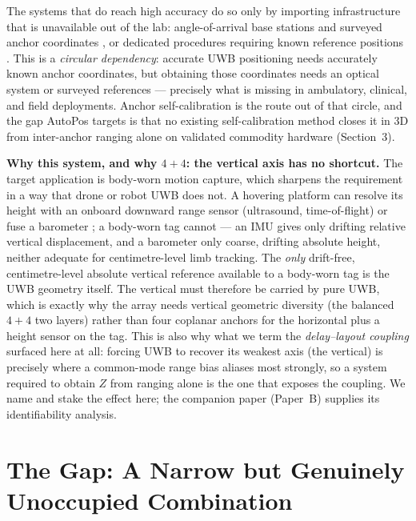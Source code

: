 \documentclass[11pt,a4paper]{article}
\begin{document}
The systems that do reach high accuracy do so only by importing infrastructure that is unavailable
out of the lab: angle-of-arrival base stations and surveyed anchor coordinates
\citep{zihajehzadeh_2017}, or dedicated
procedures requiring known reference positions \citep{kok_2015}. This is a \emph{circular
dependency}: accurate UWB positioning needs accurately known anchor coordinates, but obtaining those
coordinates needs an optical system or surveyed references --- precisely what is missing in
ambulatory, clinical, and field deployments. Anchor self-calibration is the route out of that
circle, and the gap AutoPos targets is that no existing self-calibration method closes it in 3D from
inter-anchor ranging alone on validated commodity hardware (Section~3).

\textbf{Why this system, and why $4{+}4$: the vertical axis has no shortcut.} The target application
is body-worn motion capture, which sharpens the requirement in a way that drone or robot UWB does
not. A hovering platform can resolve its height with an onboard downward range sensor (ultrasound,
time-of-flight) or fuse a barometer \citep{xiang_2025_uav}; a body-worn tag cannot --- an IMU gives only drifting relative
vertical displacement, and a barometer only coarse, drifting absolute height, neither adequate for
centimetre-level limb tracking. The \emph{only} drift-free, centimetre-level absolute vertical
reference available to a body-worn tag is the UWB geometry itself. The vertical must therefore be
carried by pure UWB, which is exactly why the array needs vertical geometric diversity (the balanced
$4{+}4$ two layers) rather than four coplanar anchors for the horizontal plus a height sensor on the tag.
This is also why what we term the \emph{delay--layout coupling} surfaced here at all: forcing UWB to
recover its weakest axis (the vertical) is precisely where a common-mode range bias aliases most
strongly, so a system required to obtain $Z$ from ranging alone is the one that exposes the coupling.
We name and stake the effect here; the companion paper (Paper~B) supplies its identifiability analysis.

\section{The Gap: A Narrow but Genuinely Unoccupied Combination}
\end{document}
